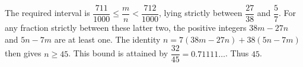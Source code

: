The required interval is $\dfrac{711}{1000}\le\dfrac{m}{n}<\dfrac{712}{1000}$, lying strictly between $\dfrac{27}{38}$ and $\dfrac{5}{7}$. For any fraction strictly between these latter two, the positive integers $38m-27n$ and $5n-7m$ are at least one. The identity $n=7(38m-27n)+38(5n-7m)$ then gives $n\ge45$. This bound is attained by $\dfrac{32}{45}=0.71111\ldots$. Thus $\boxed{45}$.
